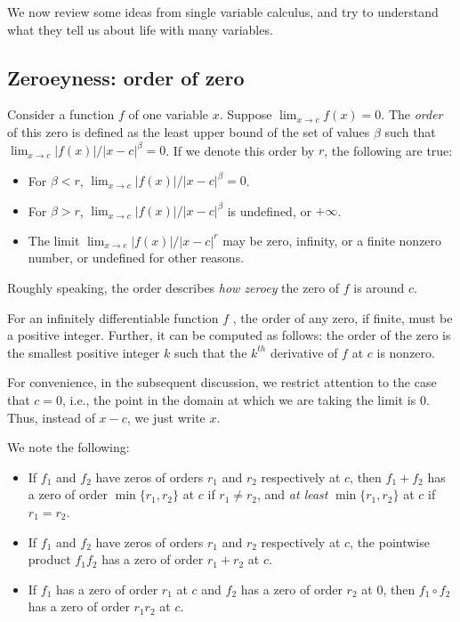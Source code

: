 \documentclass[10pt]{amsart}
\begin{document}
We now review some ideas from single variable calculus, and try to
understand what they tell us about life with many variables.

\subsection{Zeroeyness: order of zero}

Consider a function $f$ of one variable $x$. Suppose $\lim_{x \to c}
f(x) = 0$. The {\em order} of this zero is defined as the least upper
bound of the set of values $\beta$ such that $\lim_{x \to c} |f(x)|/|x
- c|^\beta = 0$. If we denote this order by $r$, the following are
true:

\begin{itemize}
\item For $\beta < r$, $\lim_{x \to c} |f(x)|/|x - c|^\beta = 0$.
\item For $\beta > r$, $\lim_{x \to c} |f(x)|/|x - c|^\beta$ is
  undefined, or $+\infty$.
\item The limit $\lim_{x \to c} |f(x)|/|x - c|^r$ may be zero,
  infinity, or a finite nonzero number, or undefined for other reasons.
\end{itemize}

Roughly speaking, the order describes {\em how zeroey} the zero of $f$
is around $c$. 

For an infinitely differentiable function $f$ , the order of any zero,
if finite, must be a positive integer. Further, it can be computed as
follows: the order of the zero is the smallest positive integer $k$
such that the $k^{th}$ derivative of $f$ at $c$ is nonzero.

For convenience, in the subsequent discussion, we restrict attention
to the case that $c = 0$, i.e., the point in the domain at which we
are taking the limit is $0$. Thus, instead of $x - c$, we just write
$x$.

We note the following:

\begin{itemize}
\item If $f_1$ and $f_2$ have zeros of orders $r_1$ and $r_2$
  respectively at $c$, then $f_1 + f_2$ has a zero of order $\min \{
  r_1,r_2 \}$ at $c$ if $r_1 \ne r_2$, and {\em at least} $\min \{
  r_1, r_2 \}$ at $c$ if $r_1 = r_2$.
\item If $f_1$ and $f_2$ have zeros of orders $r_1$ and $r_2$
  respectively at $c$, the pointwise product $f_1f_2$ has a zero of
  order $r_1 + r_2$ at $c$.
\item If $f_1$ has a zero of order $r_1$ at $c$ and $f_2$ has a zero
  of order $r_2$ at $0$, then $f_1 \circ f_2$ has a zero of order
  $r_1r_2$ at $c$.
\end{itemize}
\end{document}
